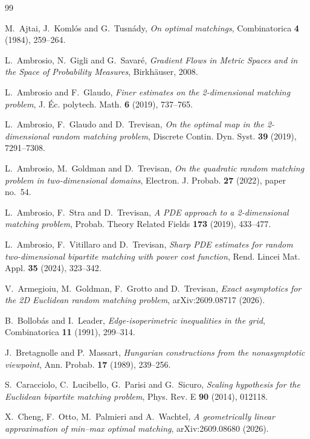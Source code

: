 \documentclass[11pt]{article}
\theoremstyle{definition}
\theoremstyle{remark}
\numberwithin{equation}{section}
\begin{document}
\begin{thebibliography}{99}

M.~Ajtai, J.~Koml\'os and G.~Tusn\'ady,
\emph{On optimal matchings},
Combinatorica \textbf{4} (1984), 259--264.

L.~Ambrosio, N.~Gigli and G.~Savar\'e,
\emph{Gradient Flows in Metric Spaces and in the Space of Probability
Measures}, Birkh\"auser, 2008.

L.~Ambrosio and F.~Glaudo,
\emph{Finer estimates on the 2-dimensional matching problem},
J. \'Ec. polytech. Math. \textbf{6} (2019), 737--765.

L.~Ambrosio, F.~Glaudo and D.~Trevisan,
\emph{On the optimal map in the 2-dimensional random matching problem},
Discrete Contin. Dyn. Syst. \textbf{39} (2019), 7291--7308.

L.~Ambrosio, M.~Goldman and D.~Trevisan,
\emph{On the quadratic random matching problem in two-dimensional domains},
Electron. J. Probab. \textbf{27} (2022), paper no.~54.

L.~Ambrosio, F.~Stra and D.~Trevisan,
\emph{A PDE approach to a 2-dimensional matching problem},
Probab. Theory Related Fields \textbf{173} (2019), 433--477.

L.~Ambrosio, F.~Vitillaro and D.~Trevisan,
\emph{Sharp PDE estimates for random two-dimensional bipartite matching
with power cost function}, Rend. Lincei Mat. Appl. \textbf{35} (2024),
323--342.

V.~Armegioiu, M.~Goldman, F.~Grotto and D.~Trevisan,
\emph{Exact asymptotics for the 2D Euclidean random matching problem},
arXiv:2609.08717 (2026).

B.~Bollob\'as and I.~Leader,
\emph{Edge-isoperimetric inequalities in the grid},
Combinatorica \textbf{11} (1991), 299--314.

J.~Bretagnolle and P.~Massart,
\emph{Hungarian constructions from the nonasymptotic viewpoint},
Ann. Probab. \textbf{17} (1989), 239--256.

S.~Caracciolo, C.~Lucibello, G.~Parisi and G.~Sicuro,
\emph{Scaling hypothesis for the Euclidean bipartite matching problem},
Phys. Rev. E \textbf{90} (2014), 012118.

X.~Cheng, F.~Otto, M.~Palmieri and A.~Wachtel,
\emph{A geometrically linear approximation of min--max optimal matching},
arXiv:2609.08680 (2026).


\end{thebibliography}
\end{document}
